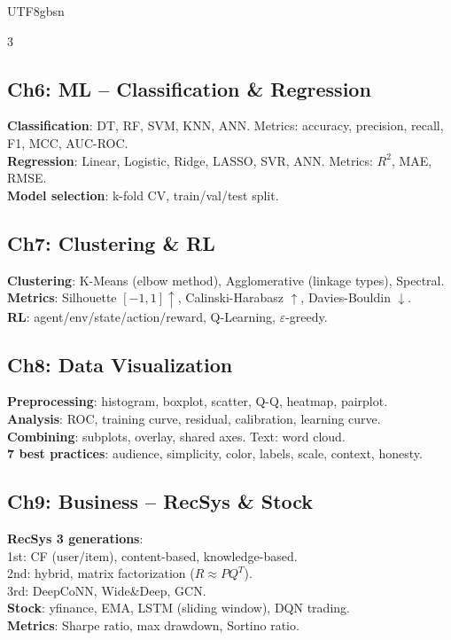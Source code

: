 \documentclass[9pt,landscape,a4paper]{article}
\begin{document}
\begin{CJK}{UTF8}{gbsn}
\begin{multicols}{3}
\subsection{Ch6: ML -- Classification \& Regression}
\textbf{Classification}: DT, RF, SVM, KNN, ANN. Metrics: accuracy, precision, recall, F1, MCC, AUC-ROC.\\
\textbf{Regression}: Linear, Logistic, Ridge, LASSO, SVR, ANN. Metrics: $R^2$, MAE, RMSE.\\
\textbf{Model selection}: k-fold CV, train/val/test split.

\subsection{Ch7: Clustering \& RL}
\textbf{Clustering}: K-Means (elbow method), Agglomerative (linkage types), Spectral.\\
\textbf{Metrics}: Silhouette $[-1,1]\uparrow$, Calinski-Harabasz $\uparrow$, Davies-Bouldin $\downarrow$.\\
\textbf{RL}: agent/env/state/action/reward, Q-Learning, $\varepsilon$-greedy.

\subsection{Ch8: Data Visualization}
\textbf{Preprocessing}: histogram, boxplot, scatter, Q-Q, heatmap, pairplot.\\
\textbf{Analysis}: ROC, training curve, residual, calibration, learning curve.\\
\textbf{Combining}: subplots, overlay, shared axes. Text: word cloud.\\
\textbf{7 best practices}: audience, simplicity, color, labels, scale, context, honesty.

\subsection{Ch9: Business -- RecSys \& Stock}
\textbf{RecSys 3 generations}:\\
1st: CF (user/item), content-based, knowledge-based.\\
2nd: hybrid, matrix factorization ($R \approx PQ^T$).\\
3rd: DeepCoNN, Wide\&Deep, GCN.\\
\textbf{Stock}: yfinance, EMA, LSTM (sliding window), DQN trading.\\
\textbf{Metrics}: Sharpe ratio, max drawdown, Sortino ratio.


\end{multicols}
\end{CJK}
\end{document}
